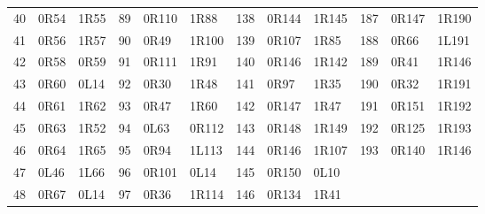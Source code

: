 \begin{longtable}{@{}rllrllrllrll@{}}
40 & 0R54 & 1R55 & 89 & 0R110 & 1R88 & 138 & 0R144 & 1R145 & 187 & 0R147 & 1R190\\
41 & 0R56 & 1R57 & 90 & 0R49 & 1R100 & 139 & 0R107 & 1R85 & 188 & 0R66 & 1L191\\
42 & 0R58 & 0R59 & 91 & 0R111 & 1R91 & 140 & 0R146 & 1R142 & 189 & 0R41 & 1R146\\
43 & 0R60 & 0L14 & 92 & 0R30 & 1R48 & 141 & 0R97 & 1R35 & 190 & 0R32 & 1R191\\
44 & 0R61 & 1R62 & 93 & 0R47 & 1R60 & 142 & 0R147 & 1R47 & 191 & 0R151 & 1R192\\
45 & 0R63 & 1R52 & 94 & 0L63 & 0R112 & 143 & 0R148 & 1R149 & 192 & 0R125 & 1R193\\
46 & 0R64 & 1R65 & 95 & 0R94 & 1L113 & 144 & 0R146 & 1R107 & 193 & 0R140 & 1R146\\
47 & 0L46 & 1L66 & 96 & 0R101 & 0L14 & 145 & 0R150 & 0L10 &  &  & \\
48 & 0R67 & 0L14 & 97 & 0R36 & 1R114 & 146 & 0R134 & 1R41 &  &  & \\
\bottomrule\end{longtable}\endgroup
